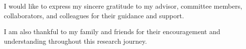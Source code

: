 I would like to express my sincere gratitude to my advisor, committee members, collaborators, and colleagues for their guidance and support.

I am also thankful to my family and friends for their encouragement and understanding throughout this research journey.

